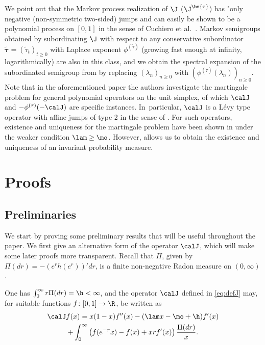 We point out that the Markov process realization of $\J$ (\resp $\J^{\bm{\tau}}$) has "only negative (\resp non-symmetric two-sided) jumps and can easily be shown to be a polynomial process on $[0,1]$ in the sense of Cuchiero et al.~\cite{cuchiero2018}. Markov semigroups obtained by subordinating $\J$ with respect to any conservative subordinator $\widetilde{\bm{\tau}} = (\widetilde{\tau}_t)_{t \geq 0}$ with Laplace exponent $\phi^{(\widetilde{\tau})}$ (growing fast enough at infinity, \eg logarithmically) are also in this class, and we obtain the spectral expansion of the subordinated semigroup
from  by replacing $(\lambda_n)_{n \geq 0}$ with $(\phi^{(\widetilde{\tau})}(\lambda_n))_{n \geq 0}$. Note that in the aforementioned paper the authors investigate the martingale problem for general polynomial operators on the unit simplex, of which $\calJ$ and $-\phi^{(\tau)}(-\calJ)$ are specific instances. In~particular, $\calJ$ is a Lévy type operator with affine jumps of type 2 in the sense of \cite{cuchiero2018}. For such operators, existence and uniqueness for the martingale problem have been shown in \cite{cuchiero2018} under the weaker condition $\lam \geq \mo$. However,  allows us to obtain the existence and uniqueness of an invariant probability measure.

\section{Proofs} \label{sec:proofs}

\subsection{Preliminaries}
We start by proving some preliminary results that will be useful throughout the paper. We first give an alternative form of the operator $\calJ$, which will make some later proofs more transparent.
Recall that $\Pi$, given by $\Pi(dr) = -(e^rh(e^r))'dr$, is a finite non-negative Radon measure on $(0,\infty)$.

\begin{lemma}
\label{lem:rewriting-stuff}
One has $\int_0^\infty r\Pi(dr) = \h < \infty$, and the operator $\calJ$ defined in \eqref{eq:defJ} may,
for suitable functions $f \colon [0,1] \to \R$, be written as
\begin{multline*}
\calJ f(x) = x(1-x)f''(x) - (\lam x-\mo+\h)f'(x)\\
+ \int_{0}^{\infty} \left(f(e^{-r}x)-f(x)+xrf'(x)\right)\frac{\Pi(dr)}{x}.
\end{multline*}
\end{lemma}

